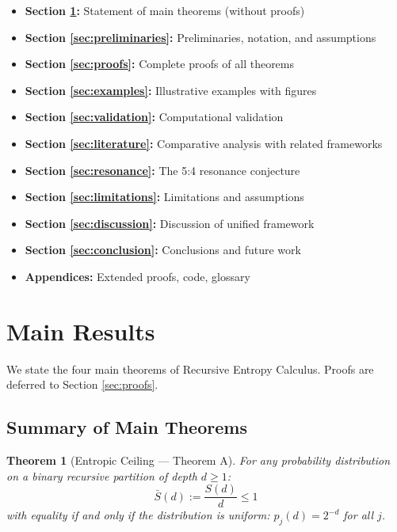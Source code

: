 \documentclass[11pt,a4paper]{article}
\newtheorem{theorem}{Theorem}[section]
\theoremstyle{definition}
\theoremstyle{remark}
\newcommand{\Sbar}{\bar{S}}
\begin{document}
\begin{itemize}[nosep]
    \item \textbf{Section \ref{sec:main_results}:} Statement of main theorems (without proofs)
    \item \textbf{Section \ref{sec:preliminaries}:} Preliminaries, notation, and assumptions
    \item \textbf{Section \ref{sec:proofs}:} Complete proofs of all theorems
    \item \textbf{Section \ref{sec:examples}:} Illustrative examples with figures
    \item \textbf{Section \ref{sec:validation}:} Computational validation
    \item \textbf{Section \ref{sec:literature}:} Comparative analysis with related frameworks
    \item \textbf{Section \ref{sec:resonance}:} The 5:4 resonance conjecture
    \item \textbf{Section \ref{sec:limitations}:} Limitations and assumptions
    \item \textbf{Section \ref{sec:discussion}:} Discussion of unified framework
    \item \textbf{Section \ref{sec:conclusion}:} Conclusions and future work
    \item \textbf{Appendices:} Extended proofs, code, glossary
\end{itemize}

\section{Main Results}
\label{sec:main_results}

We state the four main theorems of Recursive Entropy Calculus. Proofs are deferred to Section \ref{sec:proofs}.

\subsection{Summary of Main Theorems}

\begin{theorem}[Entropic Ceiling --- Theorem A]
\label{thm:A}
For any probability distribution on a binary recursive partition of depth $d \geq 1$:
\begin{equation}
    \Sbar(d) := \frac{S(d)}{d} \leq 1
\end{equation}
with equality if and only if the distribution is uniform: $p_j(d) = 2^{-d}$ for all $j$.
\end{theorem}
\end{document}
